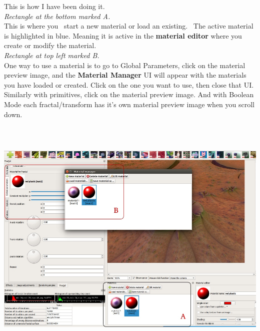 This is how I have been doing it.\\[2\baselineskip]\emph{Rectangle at
the bottom marked A.}\\[2\baselineskip]This is where you~ start a new
material or load an existing.~ The active material is highlighted in
blue. Meaning it is active in the \textbf{material editor} where you
create or modify the material.\\[2\baselineskip]\emph{Rectangle at top
left marked B.}\\[2\baselineskip]One way to use a material is to go to
Global Parameters, click on the material preview image, and the
\textbf{Material Manager} UI will appear with the materials you have
loaded or created. Click on the one you want to use, then close that
UI.\\
Similarly with primitives, click on the material preview image. And with
Boolean Mode each fractal/transform has it's own material preview image
when you scroll down.

\includegraphics[width=6.69291in,height=4.68465in]{img/manual/media/image32.jpg}
